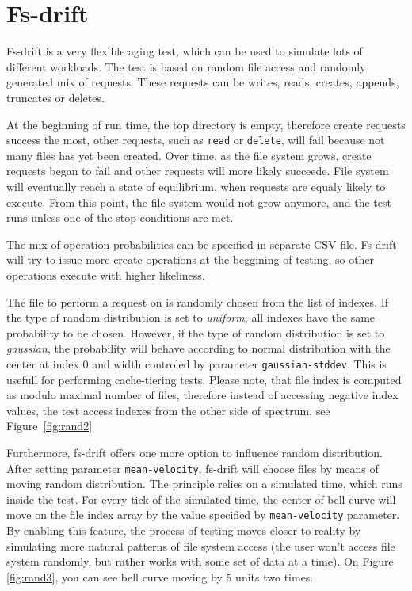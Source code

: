 \documentclass[
  color, %
  table, %
  lof,   %
  lot,   %
]{fithesis3}
\begin{document}
\section{Fs-drift}
Fs-drift is a very flexible aging test, which can be used to simulate lots of different workloads. The test is based on random file access and randomly generated mix of requests. These requests can be writes, reads, creates, appends, truncates or deletes.

At the beginning of run time, the top directory is empty, therefore create requests success the most, other requests, such as \texttt{read} or \texttt{delete}, will fail because not many files has yet been created. Over time, as the file system grows, create requests began to fail and other requests will more likely succeede. File system will eventually reach a state of equilibrium, when requests are equaly likely to execute. From this point, the file system would not grow anymore, and the test runs unless one of the stop conditions are met.

The mix of operation probabilities can be specified in separate CSV file. Fs-drift will try to issue more create operations at the beggining of testing, so other operations execute with higher likeliness.

The file to perform a request on is randomly chosen from the list of indexes. If the type of random distribution is set to \emph{uniform}, all indexes have the same probability to be chosen. However, if the type of random distribution is set to \emph{gaussian}, the probability will behave according to normal distribution with the center at index 0 and width controled by parameter \texttt{gaussian-stddev}. This is usefull for performing cache-tiering tests. Please note, that file index is computed as modulo maximal number of files, therefore instead of accessing negative index values, the test access indexes from the other side of spectrum, see Figure~\ref{fig:rand2}

Furthermore, fs-drift offers one more option to influence random distribution. After setting parameter \texttt{mean-velocity}, fs-drift will choose files by means of moving random distribution. The principle relies on a simulated time, which runs inside the test. For every tick of the simulated time, the center of bell curve will move on the file index array by the value specified by \texttt{mean-velocity} parameter. By enabling this feature, the process of testing moves closer to reality by simulating more natural patterns of file system access (the user won't access file system randomly, but rather works with some set of data at a time). On Figure \ref{fig:rand3}, you can see bell curve moving by 5 units two times.
\end{document}
